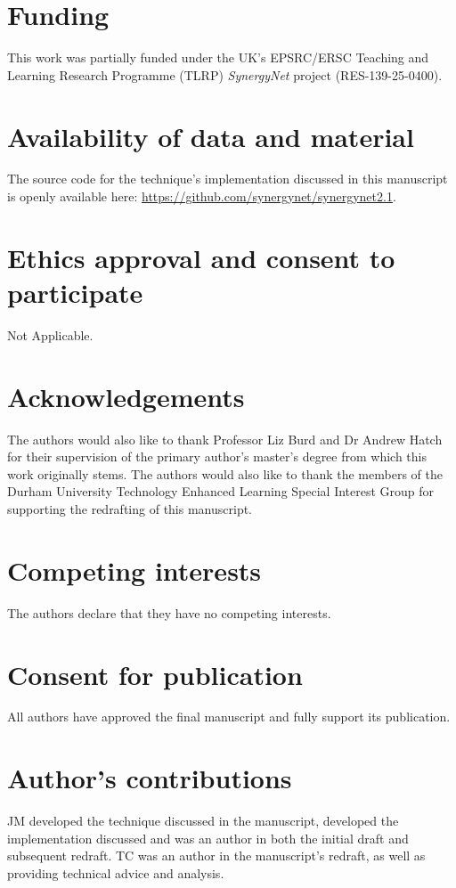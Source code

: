 \documentclass{bmcart}
\begin{document}
\begin{backmatter}

\section*{Funding}
This work was partially funded under the UK's EPSRC/ERSC Teaching and Learning Research Programme (TLRP) {\emph{SynergyNet}} project (RES-139-25-0400).

\section*{Availability of data and material}
The source code for the technique's implementation discussed in this manuscript is openly available here: \url{https://github.com/synergynet/synergynet2.1}.

\section*{Ethics approval and consent to participate}
Not Applicable.


\section*{Acknowledgements}
The authors would also like to thank Professor Liz Burd and Dr Andrew Hatch for their supervision of the primary author's master's degree from which this work originally stems.
The authors would also like to thank the members of the Durham University Technology Enhanced Learning Special Interest Group for supporting the redrafting of this manuscript.


\section*{Competing interests}
The authors declare that they have no competing interests.


\section*{Consent for publication }
All authors have approved the final manuscript and fully support its publication.


\section*{Author's contributions}
JM developed the technique discussed in the manuscript, developed the implementation discussed and was an author in both the initial draft and subsequent redraft.
TC was an author in the manuscript's redraft, as well as providing technical advice and analysis.


\end{backmatter}
\end{document}
